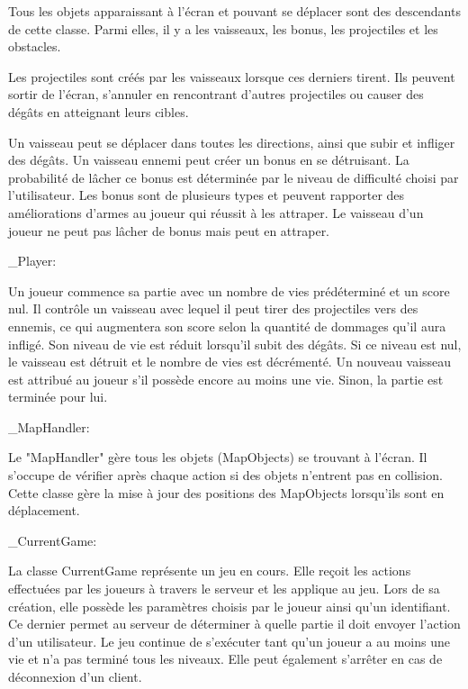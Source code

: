 \documentclass[a4paper,12pt]{article}
\begin{document}
Tous les objets apparaissant à l'écran et pouvant se déplacer sont des descendants de cette classe. 
Parmi elles, il y a les vaisseaux, les bonus, les projectiles et les obstacles. 

Les projectiles sont créés par les vaisseaux lorsque ces derniers tirent. Ils peuvent sortir de l'écran, s'annuler en rencontrant d'autres projectiles ou causer des dégâts en atteignant leurs cibles. 

Un vaisseau peut se déplacer dans toutes les directions, ainsi que subir et infliger des dégâts.
Un vaisseau ennemi peut créer un bonus en se détruisant. La probabilité de lâcher ce bonus est déterminée par le niveau de difficulté choisi par l'utilisateur. Les bonus sont de plusieurs types et peuvent rapporter des améliorations d'armes au joueur qui réussit à les attraper.
Le vaisseau d'un joueur ne peut pas lâcher de bonus mais peut en attraper.

\_Player:

Un joueur commence sa partie avec un nombre de vies prédéterminé et un score nul. 
Il contrôle un vaisseau avec lequel il peut tirer des projectiles vers des ennemis, ce qui augmentera son score selon la quantité de dommages qu'il aura infligé. Son niveau de vie est réduit lorsqu'il subit des dégâts. Si ce niveau est nul, le vaisseau est détruit et le nombre de vies est décrémenté. Un nouveau vaisseau est attribué au joueur s'il possède encore au moins une vie. Sinon, la partie est terminée pour lui.

\_MapHandler: 

Le "MapHandler" gère tous les objets (MapObjects) se trouvant à l'écran. Il s'occupe de vérifier après chaque action si des objets n'entrent pas en collision. Cette classe gère la mise à jour des positions des MapObjects lorsqu'ils sont en déplacement.

\_CurrentGame:

La classe CurrentGame représente un jeu en cours. Elle reçoit les actions effectuées par les joueurs à travers le serveur et les applique au jeu. 
Lors de sa création, elle possède les paramètres choisis par le joueur ainsi qu'un identifiant. Ce dernier permet au serveur de déterminer à quelle partie il doit envoyer l'action d'un utilisateur. Le jeu continue de s'exécuter tant qu'un joueur a au moins une vie et n'a pas terminé tous les niveaux. Elle peut également s'arrêter en cas de déconnexion d'un client.
\end{document}
